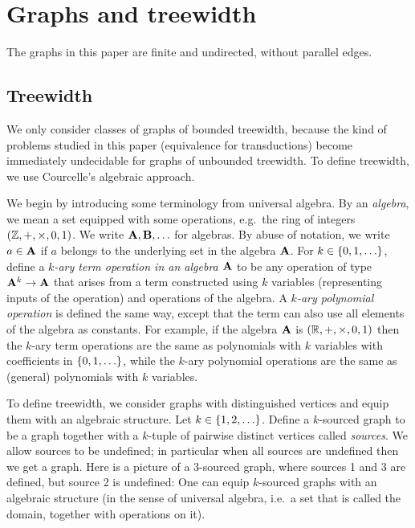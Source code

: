 \section{Graphs and treewidth}
The graphs in this paper are finite and undirected, without  parallel edges. 

\subsection{Treewidth}
\label{sec:treewidth-definition}
We only consider classes of graphs of bounded treewidth, because the kind of problems studied in this paper (equivalence for \mso transductions) become immediately undecidable for graphs of unbounded treewidth. To define treewidth, we use Courcelle's algebraic approach. 


 We begin by introducing some terminology from universal algebra. By an \emph{algebra}, we mean a set equipped with some  operations, e.g.~the ring of integers $(\mathbb Z, + , \times, 0, 1)$. We write $\mathbf{A}, \mathbf{B}, \ldots$ for algebras. By abuse of notation, we write $a \in \mathbf{A}$ if $a$ belongs to the underlying set in the algebra $\mathbf{A}$. 
        For $k \in \{0,1,\ldots\}$, define a \emph{$k$-ary term operation in an algebra $\mathbf{A}$} to be  any operation of type $\mathbf{A}^k \to \mathbf{A}$ that arises from a term constructed using $k$ variables (representing inputs of the operation) and operations of the algebra. A \emph{$k$-ary polynomial operation} is defined the same way, except that the term can also use all elements of the algebra as constants. For example, if  the algebra $\mathbf{A}$ is 
        $
        (\mathbb R, + , \times, 0 ,1)
        $
        then the $k$-ary term operations are the same as polynomials with $k$ variables with coefficients in $\{0,1,\ldots\}$, while the $k$-ary polynomial operations are the same as (general) polynomials with $k$ variables.

        
 To define treewidth, we consider graphs with distinguished vertices and equip them with an algebraic structure. 
    Let $k \in \{1,2,\ldots\}$. Define a $k$-sourced graph to be a  graph together with a $k$-tuple of pairwise distinct vertices called \emph{sources}. We allow sources to be undefined; in particular when all sources are undefined then we get a graph. Here is a 
    picture of a 3-sourced graph, where sources 1 and 3 are defined, but source 2 is undefined:
    One can equip $k$-sourced graphs with an algebraic structure (in the sense of universal algebra, i.e.~a set that is called the domain, together with operations on it).



